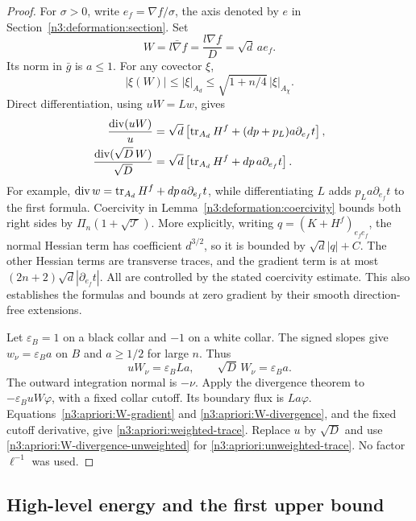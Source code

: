 \begin{proof}
For $\sigma>0$, write $e_f=\nabla f/\sigma$, the axis denoted by
$e$ in Section~\ref{n3:deformation:section}. Set
\[
 W=l\bar\nabla f=\frac{l\nabla f}{D}=\sqrt d\,a e_f.
\]
Its norm in $\bar g$ is $a\le1$.  For any covector $\xi$,
\begin{equation}
 |\xi(W)|\le |\xi|_{A_d}
                  \le\sqrt{1+n/4}\,|\xi|_{A_\chi}.
 \label{n3:apriori:W-gradient}
\end{equation}
Direct differentiation, using $uW=Lw$, gives
\begin{align}
 \frac{\operatorname{div}(uW)}u
 &=\sqrt d\left[
       \operatorname{tr}_{A_d}H^f+(dp+p_L)a\partial_{e_f}t\right],
 \label{n3:apriori:W-divergence}\\
 \frac{\operatorname{div}(\sqrt D\,W)}{\sqrt D}
 &=\sqrt d\left[
       \operatorname{tr}_{A_d}H^f+dp\,a\partial_{e_f}t\right].
 \label{n3:apriori:W-divergence-unweighted}
\end{align}
For example,
$\operatorname{div} w=\operatorname{tr}_{A_d}H^f+dp\,a\partial_{e_f}t$,
while differentiating $L$ adds $p_La\partial_{e_f}t$ to the first
formula.  Coercivity in Lemma~\ref{n3:deformation:coercivity}
bounds both right sides by $\Pi_n(1+\sqrt{\mathcal T})$.
More explicitly, writing $q=(K+H^f)_{e_fe_f}$, the normal Hessian
term has coefficient $d^{3/2}$, so it is bounded by $\sqrt d|q|+C$.
The other Hessian terms are transverse traces, and the gradient
term is at most $(2n+2)\sqrt d|\partial_{e_f}t|$.
All are controlled by the stated coercivity estimate.  This also
establishes the formulas and bounds at zero gradient by their smooth
direction-free extensions.

Let $\varepsilon_B=1$ on a black collar and $-1$ on a white collar.
The signed slopes give $w_\nu=\varepsilon_B a$ on $B$ and
$a\ge1/2$ for large $n$.  Thus
\[
 uW_\nu=\varepsilon_B La,
 \qquad \sqrt D\,W_\nu=\varepsilon_B a.
\]
The outward integration normal is $-\nu$.
Apply the divergence theorem to $-\varepsilon_B uW\varphi$, with
a fixed collar cutoff.  Its boundary flux is $La\varphi$.
Equations~\eqref{n3:apriori:W-gradient} and
\eqref{n3:apriori:W-divergence}, and the fixed cutoff derivative, give
\eqref{n3:apriori:weighted-trace}.  Replace $u$ by $\sqrt D$ and use
\eqref{n3:apriori:W-divergence-unweighted} for
\eqref{n3:apriori:unweighted-trace}.  No factor $\ell^{-1}$ was used.
\end{proof}

\subsection{High-level energy and the first upper bound}

